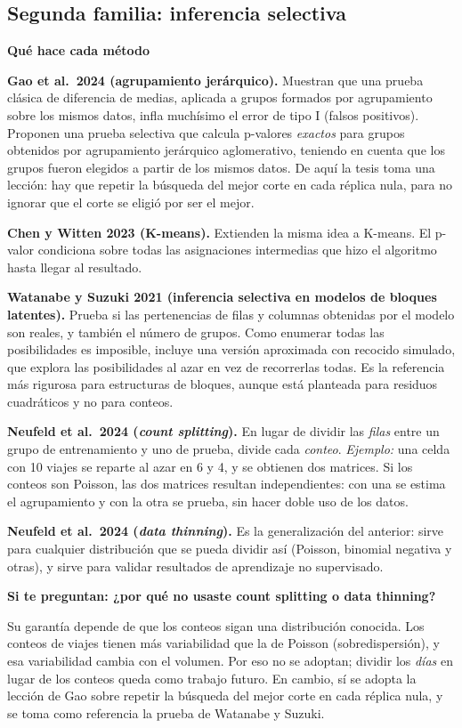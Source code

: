 \documentclass[11pt,a4paper]{article}
\newcommand{\cajainicio}[3]{\par\medskip\noindent
  \begin{lrbox}{\cajabox}\begin{minipage}{\dimexpr\linewidth-2\fboxsep-2\fboxrule\relax}%
  \textbf{\color{#1}#3}\par\smallskip}
\newcommand{\cajafin}[2]{\end{minipage}\end{lrbox}\fcolorbox{#1}{#2}{\usebox{\cajabox}}\par\medskip}
\newenvironment{nota}[1]{\cajainicio{acc}{acc!7}{#1}}{\cajafin{acc}{acc!7}}
\begin{document}
\subsection*{Segunda familia: inferencia selectiva}

\begin{nota}{Qué hace cada método}
\textbf{Gao et al.\ 2024 (agrupamiento jerárquico).} Muestran que una prueba clásica de diferencia de medias, aplicada a grupos formados por agrupamiento sobre los mismos datos, infla muchísimo el error de tipo I (falsos positivos). Proponen una prueba selectiva que calcula p-valores \emph{exactos} para grupos obtenidos por agrupamiento jerárquico aglomerativo, teniendo en cuenta que los grupos fueron elegidos a partir de los mismos datos. De aquí la tesis toma una lección: hay que repetir la búsqueda del mejor corte en cada réplica nula, para no ignorar que el corte se eligió por ser el mejor.

\textbf{Chen y Witten 2023 (K-means).} Extienden la misma idea a K-means. El p-valor condiciona sobre todas las asignaciones intermedias que hizo el algoritmo hasta llegar al resultado.

\textbf{Watanabe y Suzuki 2021 (inferencia selectiva en modelos de bloques latentes).} Prueba si las pertenencias de filas y columnas obtenidas por el modelo son reales, y también el número de grupos. Como enumerar todas las posibilidades es imposible, incluye una versión aproximada con recocido simulado, que explora las posibilidades al azar en vez de recorrerlas todas. Es la referencia más rigurosa para estructuras de bloques, aunque está planteada para residuos cuadráticos y no para conteos.

\textbf{Neufeld et al.\ 2024 (\emph{count splitting}).} En lugar de dividir las \emph{filas} entre un grupo de entrenamiento y uno de prueba, divide cada \emph{conteo}. \textit{Ejemplo:} una celda con 10 viajes se reparte al azar en 6 y 4, y se obtienen dos matrices. Si los conteos son Poisson, las dos matrices resultan independientes: con una se estima el agrupamiento y con la otra se prueba, sin hacer doble uso de los datos.

\textbf{Neufeld et al.\ 2024 (\emph{data thinning}).} Es la generalización del anterior: sirve para cualquier distribución que se pueda dividir así (Poisson, binomial negativa y otras), y sirve para validar resultados de aprendizaje no supervisado.
\end{nota}

\begin{nota}{Si te preguntan: ¿por qué no usaste count splitting o data thinning?}
Su garantía depende de que los conteos sigan una distribución conocida. Los conteos de viajes tienen más variabilidad que la de Poisson (sobredispersión), y esa variabilidad cambia con el volumen. Por eso no se adoptan; dividir los \emph{días} en lugar de los conteos queda como trabajo futuro. En cambio, sí se adopta la lección de Gao sobre repetir la búsqueda del mejor corte en cada réplica nula, y se toma como referencia la prueba de Watanabe y Suzuki.
\end{nota}
\end{document}

